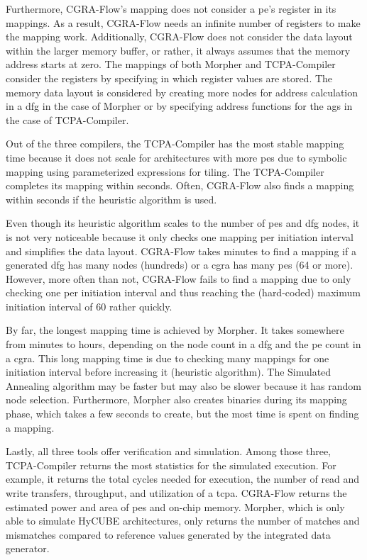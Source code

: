 Furthermore, CGRA-Flow's mapping does not consider a \ac{pe}'s register in its mappings.
As a result, CGRA-Flow needs an infinite number of registers to make the mapping work.
Additionally, CGRA-Flow does not consider the data layout within the larger memory buffer, or rather, it always assumes that the memory address starts at zero.
The mappings of both Morpher and TCPA-Compiler consider the registers by specifying in which register values are stored.
The memory data layout is considered by creating more nodes for address calculation in a \ac{dfg} in the case of Morpher or by specifying address functions for the \acp{ag} in the case of TCPA-Compiler.

Out of the three compilers, the TCPA-Compiler has the most stable mapping time because it does not scale for architectures with more \acp{pe} due to symbolic mapping using parameterized expressions for tiling.
The TCPA-Compiler completes its mapping within seconds.
Often, CGRA-Flow also finds a mapping within seconds if the heuristic algorithm is used.

Even though its heuristic algorithm scales to the number of \acp{pe} and \ac{dfg} nodes, it is not very noticeable because it only checks one mapping per initiation interval and simplifies the data layout.
CGRA-Flow takes minutes to find a mapping if a generated \ac{dfg} has many nodes (hundreds) or a \ac{cgra} has many \acp{pe} (64 or more).
However, more often than not, CGRA-Flow fails to find a mapping due to only checking one per initiation interval and thus reaching the (hard-coded) maximum initiation interval of 60 rather quickly.

By far, the longest mapping time is achieved by Morpher.
It takes somewhere from minutes to hours, depending on the node count in a \ac{dfg} and the \ac{pe} count in a \ac{cgra}.
This long mapping time is due to checking many mappings for one initiation interval before increasing it (heuristic algorithm).
The Simulated Annealing algorithm may be faster but may also be slower because it has random node selection.
Furthermore, Morpher also creates binaries during its mapping phase, which takes a few seconds to create, but the most time is spent on finding a mapping.


Lastly, all three tools offer verification and simulation.
Among those three, TCPA-Compiler returns the most statistics for the simulated execution.
For example, it returns the total cycles needed for execution, the number of read and write transfers, throughput, and utilization of a \ac{tcpa}.
CGRA-Flow returns the estimated power and area of \acp{pe} and on-chip memory.
Morpher, which is only able to simulate HyCUBE architectures, only returns the number of matches and mismatches compared to reference values generated by the integrated data generator.

